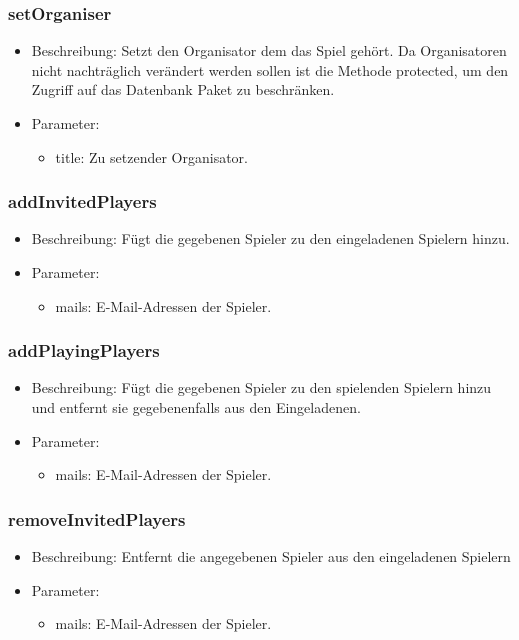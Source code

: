 \documentclass[a4paper]{scrreprt}
\begin{document}
	\subsubsection{setOrganiser}
	\begin{itemize}
		\item Beschreibung: Setzt den Organisator dem das Spiel gehört.
		Da Organisatoren nicht nachträglich verändert werden sollen ist die Methode protected, um den Zugriff auf das Datenbank Paket zu beschränken.
		\item Parameter:
		\begin{itemize}
			\item title: Zu setzender Organisator.
		\end{itemize}
	\end{itemize}

	\subsubsection{addInvitedPlayers}
	\begin{itemize}
		\item Beschreibung: Fügt die gegebenen Spieler zu den eingeladenen Spielern hinzu.
		\item Parameter:
		\begin{itemize}
			\item mails: E-Mail-Adressen der Spieler.
		\end{itemize}
	\end{itemize}

	\subsubsection{addPlayingPlayers}
	\begin{itemize}
		\item Beschreibung: Fügt die gegebenen Spieler zu den spielenden Spielern hinzu und entfernt sie gegebenenfalls aus den Eingeladenen.
		\item Parameter:
		\begin{itemize}
			\item mails: E-Mail-Adressen der Spieler.
		\end{itemize}
	\end{itemize}

	\subsubsection{removeInvitedPlayers}
	\begin{itemize}
		\item Beschreibung: Entfernt die angegebenen Spieler aus den eingeladenen Spielern
		\item Parameter:
		\begin{itemize}
			\item mails: E-Mail-Adressen der Spieler.
		\end{itemize}
	\end{itemize}
\end{document}
